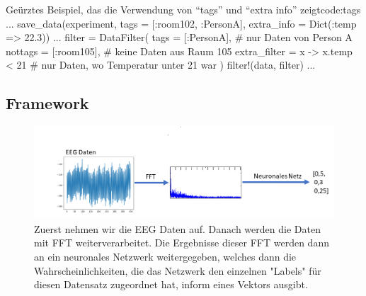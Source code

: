 \documentclass[10pt]{article}
\begin{document}
\begin{code}{Geürztes Beispiel, das die Verwendung von \enquote{tags} und \enquote{extra info} zeigt}{code:tags}
...
save_data(experiment, tags = [:room102, :PersonA], 
    extra_info = Dict(:temp => 22.3))
...
filter = DataFilter(
    tags = [:PersonA], # nur Daten von Person A
    nottags = [:room105], # keine Daten aus Raum 105
    extra_filter = x -> x.temp < 21 # nur Daten, wo Temperatur unter 21 war
)
filter!(data, filter)
...
\end{code}
\subsection{Framework}

\begin{figure}[h!]
    \centering
    \includegraphics[width=1.0\linewidth]{pictures/Workflow.png}
    \caption{Zuerst nehmen wir die EEG Daten auf. Danach werden die Daten mit FFT weiterverarbeitet. Die Ergebnisse dieser FFT werden dann an ein neuronales Netzwerk weitergegeben, welches dann die Wahrscheinlichkeiten, die das Netzwerk den einzelnen "Labels" für diesen Datensatz zugeordnet hat, inform eines Vektors ausgibt.}
    \label{Workflow}
\end{figure}

\end{document}
